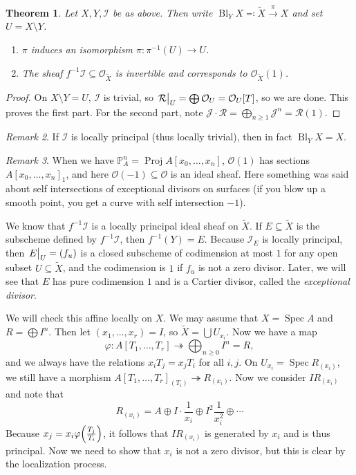\documentclass[leqno, openany]{memoir}
\newtheorem{thm}{Theorem}[section]
\theoremstyle{definition}
\theoremstyle{remark}
\newtheorem{rmk}[thm]{Remark}
\theoremstyle{plain}
\theoremstyle{definition}
\theoremstyle{remark}
\renewcommand{\P}{\mathbb{P}}
\newcommand{\mc}[1]{\mathcal{#1}}
\newcommand{\wt}[1]{\widetilde{#1}}
\DeclareMathOperator{\Spec}{Spec}
\DeclareMathOperator{\Proj}{Proj}
\DeclareMathOperator{\Bl}{Bl}
\begin{document}
\begin{thm}
    Let $X, Y, \mc{I}$ be as above. Then write $\Bl_Y X \eqqcolon \wt{X} \xrightarrow{\pi} X$ and set $U = X \setminus Y$.
    \begin{enumerate}
        \item $\pi$ induces an isomorphism $\pi \colon \pi^{-1}(U) \to U$.
        \item The sheaf $f^{-1} \mc{I} \subseteq \mc{O}_{\wt{X}}$ is invertible and corresponds to $\mc{O}_{\wt{X}}(1)$.
    \end{enumerate}
\end{thm}

\begin{proof}
    On $X \setminus Y = U$, $\mc{I}$ is trivial, so $\eval{\mc{R}}_U = \bigoplus \mc{O}_U = \mc{O}_U[T]$, so we are done. This proves the first part. For the second part, note $\mc{J} \cdot \mc{R} = \bigoplus_{n \geq 1} \mc{J}^n = \mc{R}(1)$.
\end{proof}

\begin{rmk}
    If $\mc{I}$ is locally principal (thus locally trivial), then in fact $\Bl_Y X = X$.
\end{rmk}

\begin{rmk}
    When we have $\P^n_A = \Proj A[x_0, \ldots, x_n]$, $\mc{O}(1)$ has sections ${A[x_0, \ldots, x_n]}_1$, and here $\mc{O}(-1) \subseteq \mc{O}$ is an ideal sheaf. Here something was said about self intersections of exceptional divisors on surfaces (if you blow up a smooth point, you get a curve with self intersection $-1$).
\end{rmk}

We know that $f^{-1} \mc{I}$ is a locally principal ideal sheaf on $\wt{X}$. If $E \subseteq \wt{X}$ is the subscheme defined by $f^{-1} \mc{I}$, then $f^{-1}(Y) = E$. Because $\mc{I}_E$ is locally principal, then $\eval{E}_U = (f_u)$ is a closed subscheme of codimension at most $1$ for any open subset $U \subseteq \wt{X}$, and the codimension is $1$ if $f_u$ is not a zero divisor. Later, we will see that $E$ has pure codimension $1$ and is a Cartier divisor, called the \textit{exceptional divisor}. 

We will check this affine locally on $X$. We may assume that $X = \Spec A$ and $R = \bigoplus I^n$. Then let $(x_1, \ldots, x_r) = I$, so $\wt{X} = \bigcup U_{x_i}$. Now we have a map
\[ \varphi \colon A[T_1, \ldots, T_r] \twoheadrightarrow \bigoplus_{n \geq 0} I^n = R, \]
and we always have the relations $x_i T_j = x_j T_i$ for all $i,j$. On $U_{x_i} = \Spec R_{(x_i)}$, we still have a morphism ${ A[T_1, \ldots, T_r] }_{(T_i)} \twoheadrightarrow R_{(x_i)}$. Now we consider $I R_{(x_i)}$ and note that
\[ R_{(x_i)} = A \oplus I \cdot \frac{1}{x_i} \oplus I^2 \frac{1}{x_i^2} \oplus \cdots \]
Because $x_j = x_i \varphi \qty(\frac{T_j}{T_i})$, it follows that $I R_{(x_i)}$ is generated by $x_i$ and is thus principal. Now we need to show that $x_i$ is not a zero divisor, but this is clear by the localization process.
\end{document}
